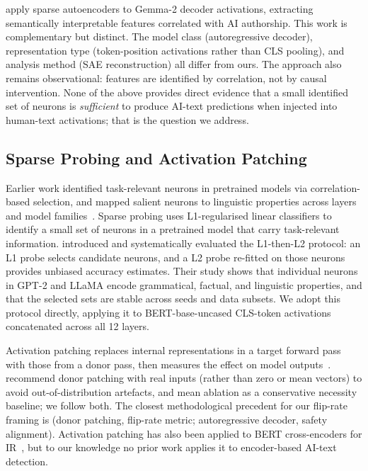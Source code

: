 \documentclass[11pt]{article}
\newcommand{\bertbase}{BERT-base-uncased\xspace}
\begin{document}
\citet{kuznetsov2025sae} apply sparse autoencoders to Gemma-2 decoder activations, extracting semantically interpretable features correlated with AI authorship. This work is complementary but distinct. The model class (autoregressive decoder), representation type (token-position activations rather than CLS pooling), and analysis method (SAE reconstruction) all differ from ours. The approach also remains observational: features are identified by correlation, not by causal intervention. None of the above provides direct evidence that a small identified set of neurons is \textit{sufficient} to produce AI-text predictions when injected into human-text activations; that is the question we address.

\subsection{Sparse Probing and Activation Patching}

Earlier work identified task-relevant neurons in pretrained models via correlation-based selection, and mapped salient neurons to linguistic properties across layers and model families~\citep{durrani2023salient}. Sparse probing uses L1-regularised linear classifiers to identify a small set of neurons in a pretrained model that carry task-relevant information. \citet{gurnee2023haystack} introduced and systematically evaluated the L1-then-L2 protocol: an L1 probe selects candidate neurons, and a L2 probe re-fitted on those neurons provides unbiased accuracy estimates. Their study shows that individual neurons in GPT-2 and LLaMA encode grammatical, factual, and linguistic properties, and that the selected sets are stable across seeds and data subsets. We adopt this protocol directly, applying it to \bertbase CLS-token activations concatenated across all 12 layers.

Activation patching replaces internal representations in a target forward pass with those from a donor pass, then measures the effect on model outputs~\citep{vig2020causal,meng2022rome}. \citet{heimersheim2024patching} recommend donor patching with real inputs (rather than zero or mean vectors) to avoid out-of-distribution artefacts, and mean ablation as a conservative necessity baseline; we follow both. The closest methodological precedent for our flip-rate framing is \citet{ravindran2025adversarial} (donor patching, flip-rate metric; autoregressive decoder, safety alignment). Activation patching has also been applied to BERT cross-encoders for IR~\citep{lu2025pathway}, but to our knowledge no prior work applies it to encoder-based AI-text detection.
\end{document}
